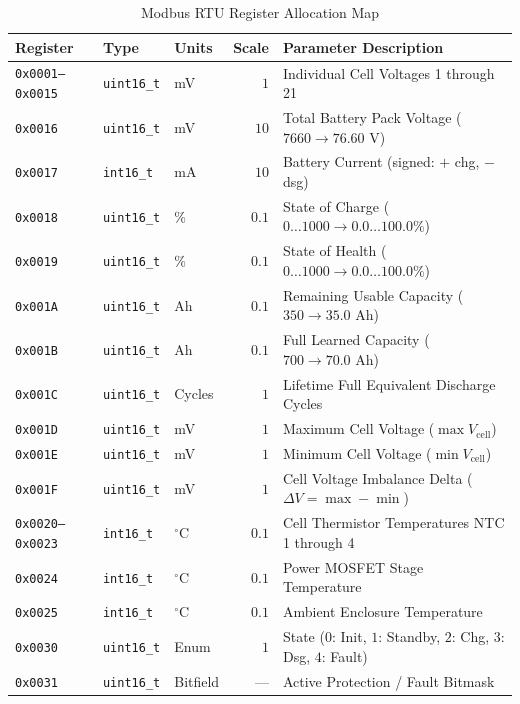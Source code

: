 \documentclass[10pt,a4paper]{article}
\begin{document}
\begin{table}[htbp]
\centering
\caption{Modbus RTU Register Allocation Map}
\label{tab:modbus_regs}
\begin{tabularx}{\textwidth}{lllrX}
\toprule
\textbf{Register} & \textbf{Type} & \textbf{Units} & \textbf{Scale} & \textbf{Parameter Description} \\
\midrule
\texttt{0x0001--0x0015} & \texttt{uint16\_t} & mV & $1$ & Individual Cell Voltages 1 through 21 \\
\texttt{0x0016} & \texttt{uint16\_t} & mV & $10$ & Total Battery Pack Voltage ($7660 \rightarrow 76.60\text{ V}$) \\
\texttt{0x0017} & \texttt{int16\_t} & mA & $10$ & Battery Current (signed: $+$ chg, $-$ dsg) \\
\texttt{0x0018} & \texttt{uint16\_t} & \% & $0.1$ & State of Charge ($0\dots 1000 \rightarrow 0.0\dots 100.0\%$) \\
\texttt{0x0019} & \texttt{uint16\_t} & \% & $0.1$ & State of Health ($0\dots 1000 \rightarrow 0.0\dots 100.0\%$) \\
\texttt{0x001A} & \texttt{uint16\_t} & Ah & $0.1$ & Remaining Usable Capacity ($350 \rightarrow 35.0\text{ Ah}$) \\
\texttt{0x001B} & \texttt{uint16\_t} & Ah & $0.1$ & Full Learned Capacity ($700 \rightarrow 70.0\text{ Ah}$) \\
\texttt{0x001C} & \texttt{uint16\_t} & Cycles & $1$ & Lifetime Full Equivalent Discharge Cycles \\
\texttt{0x001D} & \texttt{uint16\_t} & mV & $1$ & Maximum Cell Voltage ($\max V_{\text{cell}}$) \\
\texttt{0x001E} & \texttt{uint16\_t} & mV & $1$ & Minimum Cell Voltage ($\min V_{\text{cell}}$) \\
\texttt{0x001F} & \texttt{uint16\_t} & mV & $1$ & Cell Voltage Imbalance Delta ($\Delta V = \max - \min$) \\
\texttt{0x0020--0x0023} & \texttt{int16\_t} & $^\circ\text{C}$ & $0.1$ & Cell Thermistor Temperatures NTC 1 through 4 \\
\texttt{0x0024} & \texttt{int16\_t} & $^\circ\text{C}$ & $0.1$ & Power MOSFET Stage Temperature \\
\texttt{0x0025} & \texttt{int16\_t} & $^\circ\text{C}$ & $0.1$ & Ambient Enclosure Temperature \\
\texttt{0x0030} & \texttt{uint16\_t} & Enum & $1$ & State ($0$: Init, $1$: Standby, $2$: Chg, $3$: Dsg, $4$: Fault) \\
\texttt{0x0031} & \texttt{uint16\_t} & Bitfield & --- & Active Protection / Fault Bitmask \\

\end{tabularx}
\end{table}
\end{document}
